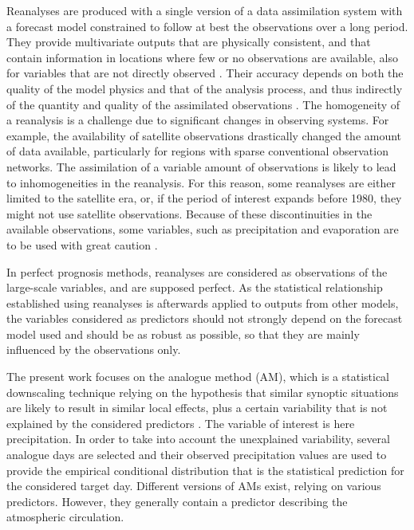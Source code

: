 \documentclass{ametsoc}
\begin{document}
Reanalyses are produced with a single version of a data assimilation system with a forecast model constrained to follow at best the observations over a long period. They provide multivariate outputs that are physically consistent, and that contain information in locations where few or no observations are available, also for variables that are not directly observed \citep{Gelaro2017}. Their accuracy depends on both the quality of the model physics and that of the analysis process, and thus indirectly of the quantity and quality of the assimilated observations \citep{Dee2011a}. The homogeneity of a reanalysis is a challenge due to significant changes in observing systems. For example, the availability of satellite observations drastically changed the amount of data available, particularly for regions with sparse conventional observation networks. The assimilation of a variable amount of observations is likely to lead to inhomogeneities in the reanalysis. For this reason, some reanalyses are either limited to the satellite era, or, if the period of interest expands before 1980, they might not use satellite observations. Because of these discontinuities in the available observations, some variables, such as precipitation and evaporation are to be used with great caution \citep{Kobayashi2015}.

In perfect prognosis methods, reanalyses are considered as observations of the large-scale variables, and are supposed perfect. As the statistical relationship established using reanalyses is afterwards applied to outputs from other models, the variables considered as predictors should not strongly depend on the forecast model used and should be as robust as possible, so that they are mainly influenced by the observations only.

The present work focuses on the analogue method (AM), which is a statistical downscaling technique relying on the hypothesis that similar synoptic situations are likely to result in similar local effects, plus a certain variability that is not explained by the considered predictors \citep{Lorenz1969}. The variable of interest is here precipitation. In order to take into account the unexplained variability, several analogue days are selected and their observed precipitation values are used to provide the empirical conditional distribution that is the statistical prediction for the considered target day. Different versions of AMs exist, relying on various predictors. However, they generally contain a predictor describing the atmospheric circulation.
\end{document}
